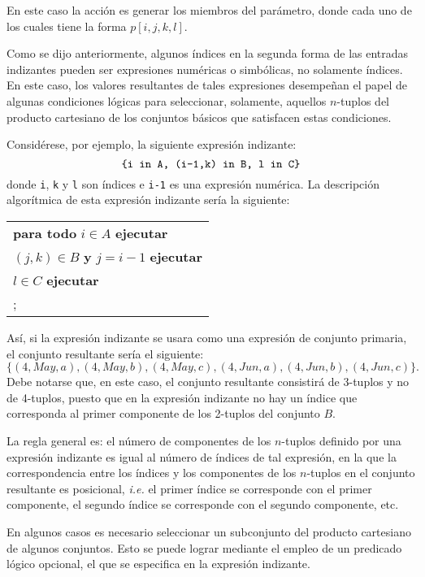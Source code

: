\documentclass[11pt,spanish]{report}
\begin{document}
\noindent En este caso la acción es generar los miembros del parámetro, donde cada uno de los cuales tiene la forma $p[i,j,k,l]$.

Como se dijo anteriormente, algunos índices en la segunda forma de las entradas indizantes pueden ser expresiones numéricas o simbólicas, no solamente índices. En este caso, los valores resultantes de tales expresiones desempeñan el papel de algunas condiciones lógicas para seleccionar, solamente, aquellos $n$-tuplos del producto cartesiano de los conjuntos básicos que satisfacen estas condiciones.

Considérese, por ejemplo, la siguiente expresión indizante:
$$\mbox{{\tt\{i in A, (i-1,k) in B, l in C\}}}$$
donde {\tt i}, {\tt k} y {\tt l} son índices e {\tt i-1} es una expresión numérica. La descripción algorítmica de esta expresión indizante sería la siguiente:

\noindent\hfil
\begin{tabular}{@{}l@{}}
{\bf para todo} $i\in A$ {\bf ejecutar}\\
\hspace{16pt}{\bf para todo} $(j,k)\in B$ {\bf y} $j=i-1$ {\bf ejecutar}\\
\hspace{32pt}{\bf para todo} $l\in C$ {\bf ejecutar}\\
\hspace{48pt}{\it acción};\\
\end{tabular}

\noindent Así, si la expresión indizante se usara como una expresión de conjunto primaria, el conjunto resultante sería el siguiente:
$$\{(4,May,a),(4,May,b),(4,May,c),(4,Jun,a),(4,Jun,b),(4,Jun,c)\}.$$
Debe notarse que, en este caso, el conjunto resultante consistirá de 3-tuplos y no de 4-tuplos, puesto que en la expresión indizante no hay un índice que corresponda al primer componente de los 2-tuplos del conjunto $B$.

La regla general es: el número de componentes de los $n$-tuplos definido por una expresión indizante es igual al número de índices de tal expresión, en la que la correspondencia entre los índices y los componentes de los $n$-tuplos en el conjunto resultante es posicional, {\it i.e.} el primer índice se corresponde con el primer componente, el segundo índice se corresponde con el segundo componente, etc.

En algunos casos es necesario seleccionar un subconjunto del producto cartesiano de algunos conjuntos. Esto se puede lograr mediante el empleo de un predicado lógico opcional, el que se especifica en la expresión indizante.
\end{document}
